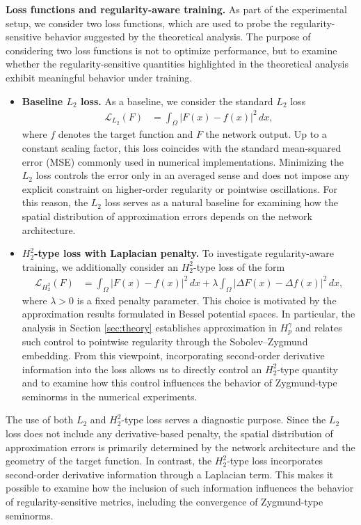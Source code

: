 \documentclass[11pt,reqno]{amsart}
\numberwithin{equation}{section}
\theoremstyle{remark}
\theoremstyle{definition}
\newcommand{\emphTitle}[1]{\medskip\noindent\textbf{#1.}\quad}
\def \L {L_2}
\def \H {H^2_2}
\begin{document}
\emphTitle{Loss functions and regularity-aware training}
As part of the experimental setup, we consider two loss functions, which are used to probe the regularity-sensitive behavior suggested by the theoretical analysis. The purpose of considering two loss functions is not to optimize performance, but to examine whether the regularity-sensitive quantities highlighted in the theoretical analysis exhibit meaningful behavior under training. 
\begin{itemize}
\item {\textbf{Baseline $\L$ loss.}}
    As a baseline, we consider the standard $\L$ loss
    \begin{align}
        \mathcal{L}_{\L}(F)
        &= \int_{\Omega} \left| F(x) - f(x) \right|^2 \, dx,
    \end{align}
    where $f$ denotes the target function and $F$ the network output.
    Up to a constant scaling factor, this loss coincides with the standard mean-squared error (MSE) commonly used in numerical implementations.
    Minimizing the \(\L\) loss controls the error only in an averaged sense and does not impose any explicit constraint on higher-order regularity or pointwise oscillations.
    For this reason, the \(\L\) loss serves as a natural baseline for examining how the spatial distribution of approximation errors depends on the network architecture.
\item {\textbf{$\H$-type loss with Laplacian penalty.}}
    To investigate regularity-aware training, we additionally consider an $\H$-type loss of the form
    \begin{align}
    \mathcal{L}_{\H}(F)
    &=
    \int_{\Omega} \left| F(x) - f(x) \right|^2 \, dx
    + \lambda
    \int_{\Omega} \left| \Delta F(x) - \Delta f(x) \right|^2 \, dx,
    \end{align}
    where $\lambda > 0$ is a fixed penalty parameter.
    This choice is motivated by the approximation results formulated in Bessel potential spaces.
    In particular, the analysis in Section \ref{sec:theory} establishes approximation in \(H^\gamma_p\) and relates such control to pointwise regularity through the Sobolev--Zygmund embedding.
    From this viewpoint, incorporating second-order derivative information into the loss allows us to directly control an \(\H\)-type quantity and to examine how this control influences the behavior of Zygmund-type seminorms in the numerical experiments.
\end{itemize}
The use of both $\L$ and $\H$-type loss serves a diagnostic purpose.
Since the \(\L\) loss does not include any derivative-based penalty, the spatial distribution of approximation errors is primarily determined by the network architecture and the geometry of the target function.
In contrast, the \(\H\)-type loss incorporates second-order derivative information through a Laplacian term. This makes it possible to examine how the inclusion of such information influences the behavior of regularity-sensitive metrics, including the convergence of Zygmund-type seminorms.
\end{document}
